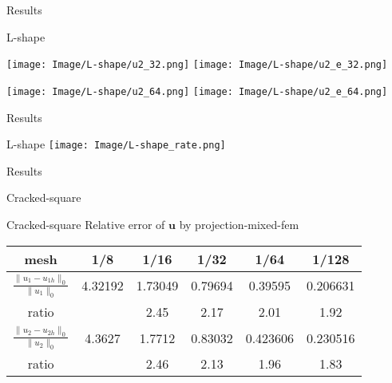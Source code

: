 \documentclass[13pt]{beamer}
\begin{document}
\begin{frame}[shrink=5]{Results}
  \begin{block}{L-shape}
   \begin{center}
     \texttt{[image: Image/L-shape/u2\_32.png]}
     \texttt{[image: Image/L-shape/u2\_e\_32.png]}
   \end{center}
   \begin{center}
     \texttt{[image: Image/L-shape/u2\_64.png]}
     \texttt{[image: Image/L-shape/u2\_e\_64.png]}
   \end{center}
  \end{block}
\end{frame}

\begin{frame}[shrink=5]{Results}
  \begin{block}{L-shape}
     \texttt{[image: Image/L-shape\_rate.png]}
  \end{block}
\end{frame}



\begin{frame}[shrink=10]{Results}
   \begin{block}{Cracked-square}
   \begin{center}

   {\color{red} Cracked-square Relative error of $\mathbf{u}$ by projection-mixed-fem}\\[2ex]
   \begin{tabular}{cccccc}
     \hline
     mesh & 1/8 & 1/16 & 1/32 & 1/64 & 1/128\\
     \hline
     $\frac{\|u_1 - u_{1h}\|_0}{\|u_1\|_0}$ &
     4.32192 & 1.73049 & 0.79694 & 0.39595 &
     0.206631 \\
     ratio &  & 2.45 & 2.17 & 2.01 & 1.92  \\
     $\frac{\|u_2 - u_{2h}\|_0}{\|u_2\|_0}$ & 4.3627 & 1.7712 & 0.83032 & 0.423606 & 0.230516 \\
     ratio &  & 2.46 & 2.13 & 1.96 & 1.83  \\
     \hline
   \end{tabular}\\[2ex]

   \end{center}
   \end{block}
\end{frame}
\end{document}
